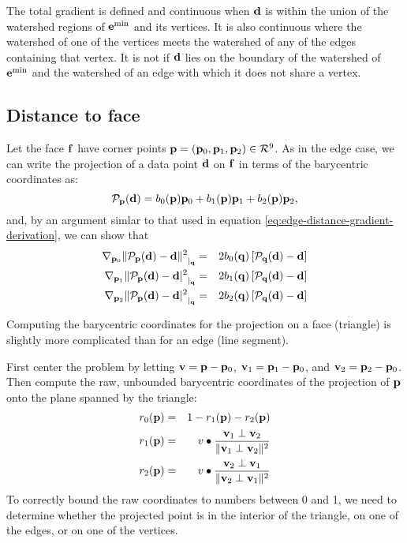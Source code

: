 The total gradient is defined and continuous
when ${\mathbf d}$ is within the union of the watershed regions
of ${\mathbf e}^{\min}$ and its vertices.
It is also continuous where the watershed of one of the vertices
meets the watershed of any of the edges containing that vertex.
It is not if ${\mathbf d}$ lies on the boundary of the
watershed of ${\mathbf e}^{\min}$ and the watershed of an
edge with which it does not share a vertex.

\subsection{Distance to face}
\label{sec:Distance-to-face}

Let the face ${\mathbf f}$ have corner points ${\mathbf p} = ({\mathbf p}_0, {\mathbf p}_1, {\mathbf p}_2) \in \mathcal{R}^9$.
As in the edge case,
we can write the projection of a data point ${\mathbf d}$ on ${\mathbf f}$
in terms of the barycentric coordinates as:
\begin{equation}
{\mathcal P}_{\mathbf p} ({\mathbf d}) = b_0({\mathbf p}) {\mathbf p}_0 + b_1({\mathbf p}) {\mathbf p}_1 + b_2({\mathbf p}) {\mathbf p}_2,
\end{equation}
and, by an argument simlar to that used in
equation \ref{eq:edge-distance-gradient-derivation},
we can show that
\begin{eqnarray}
\label{eq:face-distance-gradient}
{\mathbf \nabla}_{{\mathbf p}_0}{{ \| {\mathcal P}_{{\mathbf p}} ({\mathbf d}) - {\mathbf d} \|^2 }}_{\mid_{{\mathbf q}}}
& = & 2 b_0({\mathbf q}) \left[ {\mathcal P}_{{\mathbf q}} ({\mathbf d}) - {\mathbf d} \right]
\\
{\mathbf \nabla}_{{\mathbf p}_1}{{ \| {\mathcal P}_{{\mathbf p}} ({\mathbf d}) - {\mathbf d}|^2 }}_{\mid_{{\mathbf q}}}
& = & 2 b_1({\mathbf q}) \left[ {\mathcal P}_{\mathbf q} ({\mathbf d}) - {\mathbf d} \right]
\nonumber
\\
{\mathbf \nabla}_{{\mathbf p}_2}{{ \| {\mathcal P}_{{\mathbf p}} ({\mathbf d}) - {\mathbf d}|^2 }}_{\mid_{{\mathbf q}}}
& = & 2 b_2({\mathbf q}) \left[ {\mathcal P}_{\mathbf q} ({\mathbf d}) - {\mathbf d} \right]
\nonumber
\end{eqnarray}

Computing the barycentric coordinates for the projection
on a face (triangle) is slightly more complicated than
for an edge (line segment).

First center the problem by letting
${\mathbf v} = {\mathbf p} - {\mathbf p}_0$,
${\mathbf v}_1 = {\mathbf p}_1 - {\mathbf p}_0$, and ${\mathbf v}_2 = {\mathbf p}_2 - {\mathbf p}_0$.
Then compute the raw, unbounded barycentric coordinates
of the projection of ${\mathbf p}$ onto the plane
spanned by the triangle:
\begin{eqnarray}
r_0({\mathbf p}) & = & 1 - r_1({\mathbf p}) - r_2({\mathbf p})
\\
r_1({\mathbf p}) & = & v \bullet {{{\mathbf v}_1 \perp {\mathbf v}_2} \over {\| {\mathbf v}_1 \perp {\mathbf v}_2 \|^2} }
\nonumber
\\
r_2({\mathbf p}) & = & v \bullet {{{\mathbf v}_2 \perp {\mathbf v}_1} \over {\| {\mathbf v}_2 \perp {\mathbf v}_1 \|^2} }
\nonumber
\end{eqnarray}
To correctly bound the raw coordinates to numbers between 0 and 1,
we need to determine whether the projected point is in
the interior of the triangle, on one of the edges,
or on one of the vertices.

